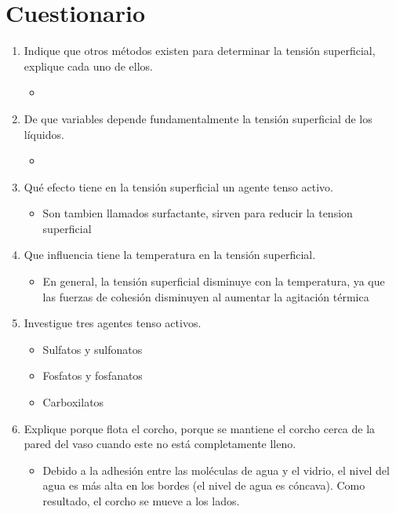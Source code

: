 \documentclass[11pt, letterpaper]{article}
\begin{document}
\section{Cuestionario}


\begin{enumerate}
   \item Indique que otros métodos existen para determinar la tensión superficial, explique cada uno de ellos.
   \begin{itemize}
     \item 
   \end{itemize}
   \item De que variables depende fundamentalmente la tensión superficial de los líquidos.
   \begin{itemize}
     \item 
   \end{itemize}
   \item Qué efecto tiene en la tensión superficial un agente tenso activo.
   \begin{itemize}
     \item Son tambien llamados surfactante, sirven para reducir la tension superficial
   \end{itemize}
   \item Que influencia tiene la temperatura en la tensión superficial.
   \begin{itemize}
     \item En general, la tensión superficial disminuye con la temperatura, ya que las fuerzas de cohesión disminuyen al aumentar la agitación térmica
   \end{itemize}
   \item Investigue tres agentes tenso activos.
   \begin{itemize}
     \item Sulfatos y sulfonatos
    \item Fosfatos y fosfanatos
\item     Carboxilatos
   \end{itemize}
   \item Explique porque flota el corcho, porque se mantiene el corcho cerca de la pared del vaso cuando este no está completamente lleno.
   \begin{itemize}
     \item Debido a la adhesión entre las moléculas de agua y el vidrio, el nivel del agua es más alta en los bordes (el nivel de agua es cóncava). Como resultado, el corcho se mueve a los lados.
   \end{itemize}

\end{enumerate}
\end{document}
